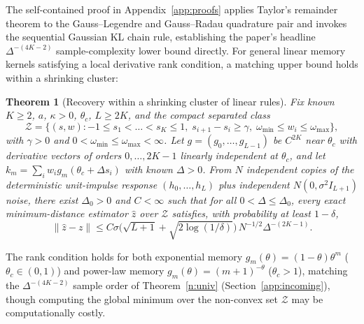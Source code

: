 \documentclass[12pt]{article}
\newtheorem{theorem}{Theorem}[section]
\theoremstyle{definition}
\theoremstyle{remark}
\begin{document}
The self-contained proof in Appendix~\ref{app:proofs} applies Taylor's remainder theorem to the Gauss--Legendre and Gauss--Radau quadrature pair and invokes the sequential Gaussian KL chain rule, establishing the paper's headline $\Delta^{-(4K-2)}$ sample-complexity lower bound directly. For general linear memory kernels satisfying a local derivative rank condition, a matching upper bound holds within a shrinking cluster:

\begin{theorem}[Recovery within a shrinking cluster of linear rules]\label{n:shape}
Fix known $K \ge 2$, $a$, $\kappa > 0$, $\theta_c$, $L \ge 2K$, and the compact separated class
\[
  \mathcal{Z} = \{(s, w) : -1 \le s_1 < \dots < s_K \le 1,\; s_{i+1} - s_i \ge \gamma,\; \omega_{\min} \le w_i \le \omega_{\max}\},
\]
with $\gamma > 0$ and $0 < \omega_{\min} \le \omega_{\max} < \infty$. Let $g = (g_0, \dots, g_{L-1})$ be $C^{2K}$ near $\theta_c$ with derivative vectors of orders $0, \dots, 2K-1$ linearly independent at $\theta_c$, and let $k_m = \sum_i w_i g_m(\theta_c + \Delta s_i)$ with known $\Delta > 0$. From $N$ independent copies of the deterministic unit-impulse response $(h_0, \dots, h_L)$ plus independent $N(0, \sigma^2 I_{L+1})$ noise, there exist $\Delta_0 > 0$ and $C < \infty$ such that for all $0 < \Delta \le \Delta_0$, every exact minimum-distance estimator $\hat{z}$ over $\mathcal{Z}$ satisfies, with probability at least $1 - \delta$,
\[
  \|\hat{z} - z\| \le C \sigma \bigl(\sqrt{L+1} + \sqrt{2\log(1/\delta)}\bigr)\, N^{-1/2} \Delta^{-(2K-1)}.
\]
\end{theorem}

The rank condition holds for both exponential memory $g_m(\theta) = (1-\theta)\theta^m$ ($\theta_c \in (0,1)$) and power-law memory $g_m(\theta) = (m+1)^{-\theta}$ ($\theta_c > 1$), matching the $\Delta^{-(4K-2)}$ sample order of Theorem~\ref{n:univ} (Section~\ref{app:incoming}), though computing the global minimum over the non-convex set $\mathcal{Z}$ may be computationally costly.
\end{document}
